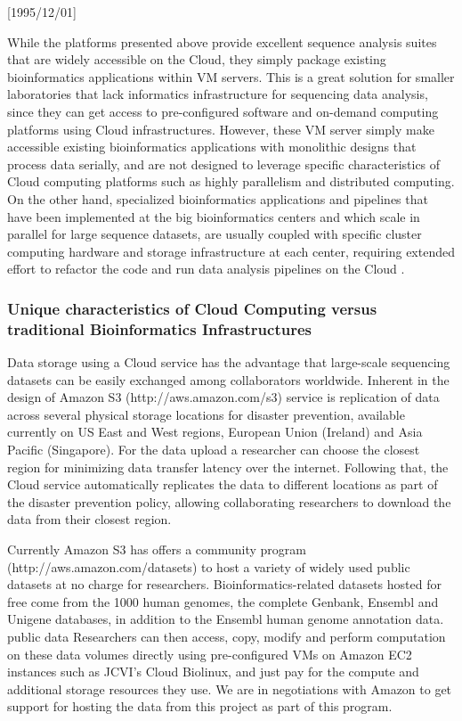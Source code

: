 \NeedsTeXFormat{LaTeX2e}[1995/12/01] \documentclass[10pt]{bmc_article}
\newenvironment{bmcformat}{\begin{raggedright}\baselineskip20pt\sloppy\setboolean{publ}{false}}{\end{raggedright}\baselineskip20pt\sloppy}
\begin{document}
\begin{bmcformat}
While the platforms presented above provide excellent sequence analysis suites that are widely accessible 
on the Cloud, they simply package existing bioinformatics applications within VM servers. This is a great 
solution for smaller laboratories that lack informatics infrastructure for sequencing data analysis, since 
they can get access to pre-configured software and on-demand computing platforms using Cloud infrastructures.  
However, these VM server simply make accessible existing bioinformatics applications with monolithic designs that
process data serially, and are not designed to leverage specific characteristics of Cloud computing platforms
such as highly parallelism and distributed computing.  On the other hand, specialized bioinformatics applications 
and pipelines that have been implemented at the big bioinformatics centers and which scale in parallel for large 
sequence datasets, are usually coupled with specific cluster computing hardware and storage infrastructure at each 
center, requiring extended effort to refactor the code and run data analysis pipelines on the Cloud \cite{Wilkening2009}.


\subsubsection*{Unique characteristics of Cloud Computing versus traditional Bioinformatics Infrastructures}

Data storage using a Cloud service has the advantage that large-scale sequencing datasets can be easily
exchanged among collaborators worldwide. Inherent in the design of Amazon S3 (http://aws.amazon.com/s3)
service is replication of data across several physical storage locations for disaster prevention, available
currently on US East and West regions, European Union (Ireland) and Asia Pacific (Singapore). For the data
upload a researcher can choose the closest region for minimizing data transfer latency over the internet.
Following that, the Cloud service automatically replicates the data to different locations as part of the
disaster prevention policy, allowing collaborating researchers to download the data from their closest region.

Currently Amazon S3 has offers a community program (http://aws.amazon.com/datasets) to host a variety of
widely used public datasets at no charge for  researchers.  Bioinformatics-related datasets hosted for free
come from the 1000 human genomes, the complete Genbank, Ensembl and Unigene databases, in addition to the
Ensembl human genome annotation data. public data Researchers can then access, copy, modify and perform
computation on these data volumes directly using pre-configured VMs on Amazon EC2 instances such as JCVI's
Cloud Biolinux, and just pay for the compute and additional storage resources they use. We are in negotiations
with Amazon to get support for hosting the data from this project as part of this program.


\end{bmcformat}
\end{document}
